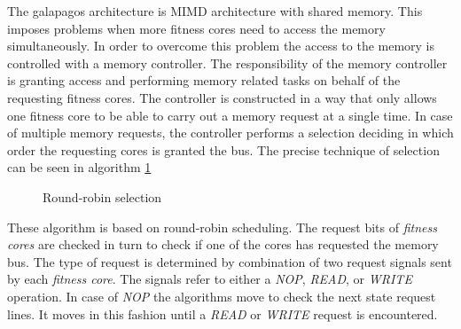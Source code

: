 The galapagos architecture is MIMD architecture with shared memory. This imposes problems when more fitness cores need to access the memory simultaneously. In order to overcome this problem the access to the memory is controlled with a memory controller. The responsibility of the memory controller is granting access and performing memory related tasks on behalf of the requesting fitness cores. The controller is constructed in a way that only allows one fitness core to be able to carry out a memory request at a single time. In case of multiple memory requests, the controller performs a selection deciding in which order the requesting cores is granted the bus. The precise technique of selection can be seen in algorithm \ref{algorithm:round-robin-selection}

\begin{figure}[H]
\begin{algorithm}[H]
\SetAlgoLined
\DontPrintSemicolon
{}
\caption{Round-robin selection}
\label{algorithm:round-robin-selection}
\end{algorithm}
\end{figure}




These algorithm is based on round-robin scheduling. The request bits of \emph{fitness cores} are checked in turn to check if one of the cores has requested the memory bus. The type of request is determined by combination of two request signals sent by each \emph{fitness core}. The signals refer to either a \emph{NOP}, \emph{READ}, or \emph{WRITE} operation. In case of \emph{NOP} the algorithms move to check the next state request lines. It moves in this fashion until a \emph{READ} or \emph{WRITE} request is encountered. 





 








